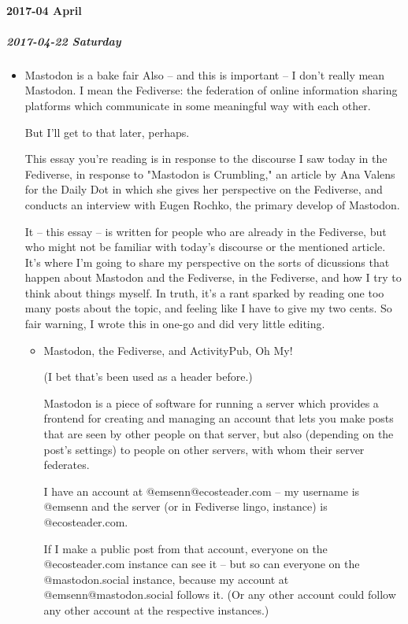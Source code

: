 \documentclass[11pt]{article}
\begin{document}
\paragraph*{2017-04 April}
\label{sec:orgf31180d}
\startcontents[level-4]
\subparagraph*{2017-04-22 Saturday}
\label{sec:org98def22}
\begin{itemize}
\item Mastodon is a bake fair
\label{sec:org54f73fc}
Also – and this is important – I don’t really mean Mastodon. I mean the Fediverse: the federation of online information sharing platforms which communicate in some meaningful way with each other.

But I’ll get to that later, perhaps.

This essay you’re reading is in response to the discourse I saw today in the Fediverse, in response to "Mastodon is Crumbling," an article by Ana Valens for the Daily Dot in which she gives her perspective on the Fediverse, and conducts an interview with Eugen Rochko, the primary develop of Mastodon.

It – this essay – is written for people who are already in the Fediverse, but who might not be familiar with today’s discourse or the mentioned article. It’s where I’m going to share my perspective on the sorts of dicussions that happen about Mastodon and the Fediverse, in the Fediverse, and how I try to think about things myself. In truth, it’s a rant sparked by reading one too many posts about the topic, and feeling like I have to give my two cents. So fair warning, I wrote this in one-go and did very little editing.
\begin{itemize}
\item Mastodon, the Fediverse, and ActivityPub, Oh My!
\label{sec:org95712cf}

(I bet that’s been used as a header before.)

Mastodon is a piece of software for running a server which provides a frontend for creating and managing an account that lets you make posts that are seen by other people on that server, but also (depending on the post’s settings) to people on other servers, with whom their server federates.

I have an account at @emsenn@ecosteader.com – my username is @emsenn and the server (or in Fediverse lingo, instance) is @ecosteader.com.

If I make a public post from that account, everyone on the @ecosteader.com instance can see it – but so can everyone on the @mastodon.social instance, because my account at @emsenn@mastodon.social follows it. (Or any other account could follow any other account at the respective instances.)


\end{itemize}
\end{itemize}
\end{document}
